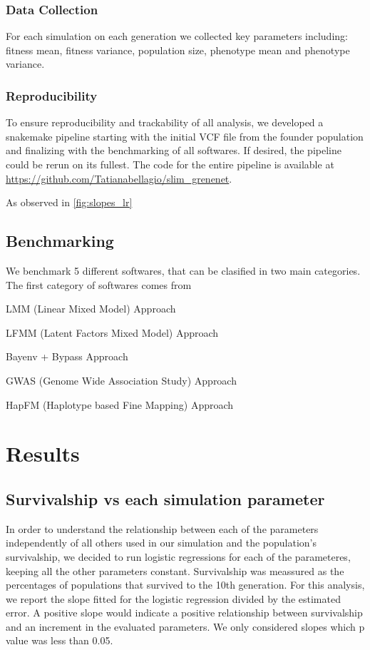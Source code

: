 \documentclass{article}
\begin{document}
\subsubsection{Data Collection}
For each simulation on each generation we collected key parameters including: fitness mean, fitness variance, population size, phenotype mean and phenotype variance. 

\subsubsection{Reproducibility}
To ensure reproducibility and trackability of all analysis, we developed a snakemake \citep{Molder2021-ho} pipeline starting with the initial VCF file from the founder population and finalizing with the benchmarking of all softwares. If desired, the pipeline could be rerun on its fullest. The code for the entire pipeline is available at \url{https://github.com/Tatianabellagio/slim_grenenet}.

As observed in \ref{fig:slopes_lr} 
\subsection{Benchmarking}

We benchmark 5 different softwares, that can be clasified in two main categories. The first category of softwares comes from 

LMM (Linear Mixed Model) Approach 

LFMM (Latent Factors Mixed Model) Approach

Bayenv + Bypass Approach 

GWAS (Genome Wide Association Study) Approach 

HapFM (Haplotype based Fine Mapping) Approach 

\section{Results}

\subsection{Survivalship vs each simulation parameter}

In order to understand the relationship between each of the parameters independently of all others used in our simulation and the population's survivalship, we decided to run logistic regressions for each of the parameteres, keeping all the other parameters constant. Survivalship was meassured as the percentages of populations that survived to the 10th generation. For this analysis, we report the slope fitted for the logistic regression divided by the estimated error. A positive slope would indicate a positive relationship between survivalship and an increment in the evaluated parameters. We only considered slopes which p value was less than 0.05. 
\end{document}
